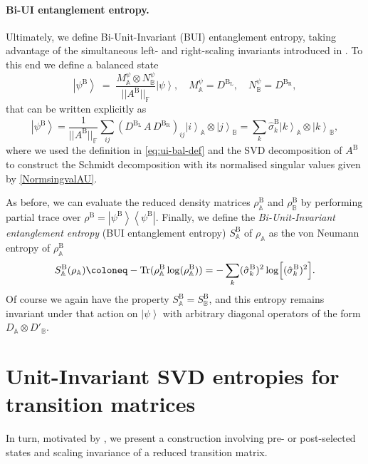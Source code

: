 \documentclass[11pt,a4paper]{article}
\newcommand{\Tr}{\text{Tr}}
\newcommand{\ket}[1]{\left|#1\right\rangle}
\newcommand{\bra}[1]{\left\langle#1\right|}
\begin{document}
\paragraph{Bi-UI entanglement entropy.} Ultimately, we define Bi-Unit-Invariant (BUI) entanglement entropy, taking advantage of the simultaneous left- and right-scaling invariants introduced in \cite{uhlmann-main2}. To this end we define a balanced state 
\begin{equation}
 \ket{\psi^\mathrm{B}} \;=\; \frac{M^\psi_\mathbb{A}\otimes N^\psi_\mathbb{B}}{||A^\mathrm{B}||_\mathbb{F}}\ket{\psi}, \quad M^\psi_\mathbb{A} = D^{\mathrm{B_L}}, \quad N^\psi_\mathbb{B} 
 = D^{\mathrm{B_R}},
 \label{eq:balanced-full}
\end{equation}
that can be written explicitly as
\begin{equation}
\ket{\psi^\mathrm{B}}=\frac{1}{||A^\mathrm{B}||_\mathbb{F}}\sum_{ij}({D}^{\mathrm{B_L}}\,A\,{D}^{\mathrm{B_R}})_{ij}\ket{i}_\mathbb{A}\otimes \ket{j}_\mathbb{B}=\sum_{k}\hat{\sigma}^\mathrm{B}_k\ket{k}_\mathbb{A}\otimes \ket{k}_\mathbb{B},
\end{equation}
where we used the definition in \cref{eq:ui-bal-def} and the SVD decomposition of $A^\mathrm{B}$ to construct the Schmidt decomposition with its normalised singular values given by \cref{NormsingvalAU}.

As before, we can evaluate the reduced density matrices $\rho^\mathrm{B}_{\mathbb{A}}$ and $\rho^\mathrm{B}_{\mathbb{B}}$ by performing partial trace over $\rho^\mathrm{B}=\ket{\psi^\mathrm{B}}\bra{\psi^\mathrm{B}}$. Finally, we define the \textit{Bi-Unit-Invariant entanglement entropy} (BUI entanglement entropy) $S^{\mathrm{B}}_\mathbb{A}$ of $\rho_\mathbb{A}$ as the von Neumann entropy of $\rho^{\mathrm B}_{\mathbb{A}}$
\begin{equation}
 S^{\mathrm{B}}_\mathbb{A}(\rho_\mathbb{A})\coloneq -\Tr(\rho^\mathrm{B}_{\mathbb{A}}\log(\rho^{\mathrm{B}}_{\mathbb{A}})) = -\sum_{k} (\hat{\sigma}_k^\mathrm{B})^2 \log\Bigl[(\hat{\sigma}_k^\mathrm{B})^2\Bigr]. 
 \label{eq:entropy-full}
\end{equation}
Of course we again have the property $S^{\mathrm{B}}_\mathbb{A}=S^{\mathrm{B}}_\mathbb{B}$, and this entropy remains invariant under that action on $\ket{\psi}$ with arbitrary diagonal operators of the form \(D_\mathbb{A}\otimes D'_\mathbb{B}\).
\section{Unit-Invariant SVD entropies for transition matrices} \label{UISVDprepost}
In turn, motivated by \cite{Nakata:2020luh,Parzygnat:2023avh}, we present a construction involving pre- or post-selected states and scaling invariance of a reduced transition matrix. 
\end{document}

